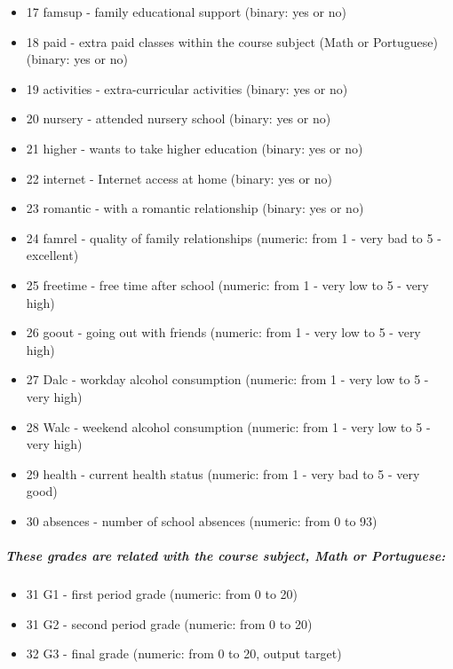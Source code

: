 \documentclass[
]{book}
\providecommand{\tightlist}{%
  \setlength{\itemsep}{0pt}\setlength{\parskip}{0pt}}
\theoremstyle{definition}
\theoremstyle{definition}
\theoremstyle{definition}
\theoremstyle{definition}
\theoremstyle{remark}
\begin{document}
\begin{itemize}
\tightlist
\item
  17 famsup - family educational support (binary: yes or no)
\item
  18 paid - extra paid classes within the course subject (Math or Portuguese) (binary: yes or no)
\item
  19 activities - extra-curricular activities (binary: yes or no)
\item
  20 nursery - attended nursery school (binary: yes or no)
\item
  21 higher - wants to take higher education (binary: yes or no)
\item
  22 internet - Internet access at home (binary: yes or no)
\item
  23 romantic - with a romantic relationship (binary: yes or no)
\item
  24 famrel - quality of family relationships (numeric: from 1 - very bad to 5 - excellent)
\item
  25 freetime - free time after school (numeric: from 1 - very low to 5 - very high)
\item
  26 goout - going out with friends (numeric: from 1 - very low to 5 - very high)
\item
  27 Dalc - workday alcohol consumption (numeric: from 1 - very low to 5 - very high)
\item
  28 Walc - weekend alcohol consumption (numeric: from 1 - very low to 5 - very high)
\item
  29 health - current health status (numeric: from 1 - very bad to 5 - very good)
\item
  30 absences - number of school absences (numeric: from 0 to 93)
\end{itemize}

\hypertarget{these-grades-are-related-with-the-course-subject-math-or-portuguese}{%
\subparagraph{\texorpdfstring{\textbf{These grades are related with the course subject, Math or Portuguese:}}{These grades are related with the course subject, Math or Portuguese:}}\label{these-grades-are-related-with-the-course-subject-math-or-portuguese}}

\begin{itemize}
\tightlist
\item
  31 G1 - first period grade (numeric: from 0 to 20)
\item
  31 G2 - second period grade (numeric: from 0 to 20)
\item
  32 G3 - final grade (numeric: from 0 to 20, output target)
\end{itemize}
\end{document}
